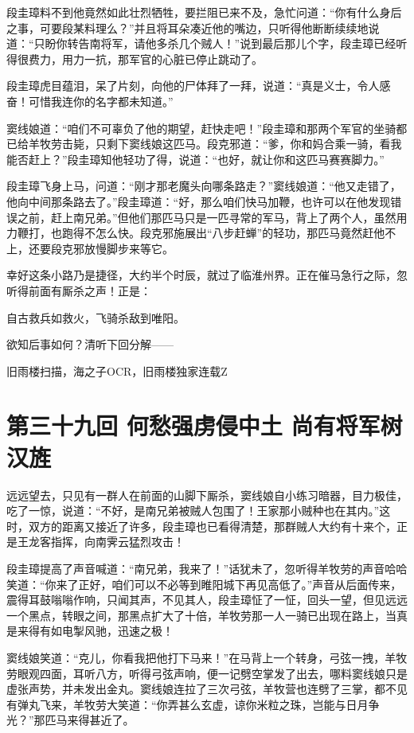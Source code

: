 \documentclass[12pt,oneside]{book}
\begin{document}
段圭璋料不到他竟然如此壮烈牺牲，要拦阻已来不及，急忙问道：``你有什么身后之事，可要段某料理么？''并且将耳朵凑近他的嘴边，只听得他断断续续地说道：``只盼你转告南将军，请他多杀几个贼人！''说到最后那儿个字，段圭璋已经听得很费力，用力一抗，那军官的心脏已停止跳动了。

段圭璋虎目蕴泪，呆了片刻，向他的尸体拜了一拜，说道：``真是义士，令人感奋！可惜我连你的名字都未知道。''

窦线娘道：``咱们不可辜负了他的期望，赶快走吧！''段圭璋和那两个军官的坐骑都已给羊牧劳击毙，只剩下窦线娘这匹马。段克邪道：``爹，你和妈合乘一骑，看我能否赶上？''段圭璋知他轻功了得，说道：``也好，就让你和这匹马赛赛脚力。''

段圭璋飞身上马，问道：``刚才那老魔头向哪条路走？''窦线娘道：``他又走错了，他向中间那条路去了。''段圭璋道：``好，那么咱们快马加鞭，也许可以在他发现错误之前，赶上南兄弟。''但他们那匹马只是一匹寻常的军马，背上了两个人，虽然用力鞭打，也跑得不怎么快。段克邪施展出``八步赶蝉''的轻功，那匹马竟然赶他不上，还要段克邪放慢脚步来等它。

幸好这条小路乃是捷径，大约半个时辰，就过了临淮州界。正在催马急行之际，忽听得前面有厮杀之声！正是：

自古救兵如救火，飞骑杀敌到唯阳。

欲知后事如何？清听下回分解------

旧雨楼扫描，海之子OCR，旧雨楼独家连载Z

\chapter{第三十九回 何愁强虏侵中土
尚有将军树汉旌}\label{ux7b2cux4e09ux5341ux4e5dux56de-ux4f55ux6101ux5f3aux864fux4fb5ux4e2dux571f-ux5c1aux6709ux5c06ux519bux6811ux6c49ux65cc}

远远望去，只见有一群人在前面的山脚下厮杀，窦线娘自小练习暗器，目力极佳，吃了一惊，说道：``不好，是南兄弟被贼人包围了！王家那小贼种也在其内。''这时，双方的距离又接近了许多，段圭璋也已看得清楚，那群贼人大约有十来个，正是王龙客指挥，向南霁云猛烈攻击！

段圭璋提高了声音喊道：``南兄弟，我来了！''话犹未了，忽听得羊牧劳的声音哈哈笑道：``你来了正好，咱们可以不必等到睢阳城下再见高低了。''声音从后面传来，震得耳鼓嗡嗡作响，只闻其声，不见其人，段圭璋怔了一怔，回头一望，但见远远一个黑点，转眼之间，那黑点扩大了十倍，羊牧劳那一人一骑已出现在路上，当真是来得有如电掣风驰，迅速之极！

窦线娘笑道：``克儿，你看我把他打下马来！''在马背上一个转身，弓弦一拽，羊牧劳眼观四面，耳听八方，听得弓弦声响，便一记劈空掌发了出去，哪料窦线娘只是虚张声势，并未发出金丸。窦线娘连拉了三次弓弦，羊牧营也连劈了三掌，都不见有弹丸飞来，羊牧劳大笑道：``你弄甚么玄虚，谅你米粒之珠，岂能与日月争光？''那匹马来得甚近了。
\end{document}
